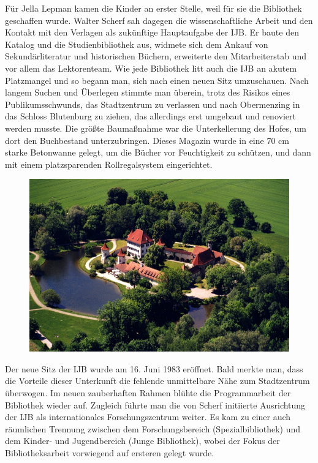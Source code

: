\documentclass[a4paper,
fontsize=11pt,
oneside,
numbers=noperiodatend,
parskip=half-,
bibliography=totoc,
final
]{scrartcl}
\begin{document}
Für Jella Lepman kamen die Kinder an erster Stelle, weil für sie die
Bibliothek geschaffen wurde. Walter Scherf sah dagegen die
wissenschaftliche Arbeit und den Kontakt mit den Verlagen als zukünftige
Hauptaufgabe der IJB. Er baute den Katalog und die Studienbibliothek
aus, widmete sich dem Ankauf von Sekundärliteratur und historischen
Büchern, erweiterte den Mitarbeiterstab und vor allem das Lektorenteam.
Wie jede Bibliothek litt auch die IJB an akutem Platzmangel und so
begann man, sich nach einen neuen Sitz umzuschauen. Nach langem Suchen
und Überlegen stimmte man überein, trotz des Risikos eines
Publikumsschwunds, das Stadtzentrum zu verlassen und nach Obermenzing in
das Schloss Blutenburg zu ziehen, das allerdings erst umgebaut und
renoviert werden musste. Die größte Baumaßnahme war die Unterkellerung
des Hofes, um dort den Buchbestand unterzubringen. Dieses Magazin wurde
in eine 70 cm starke Betonwanne gelegt, um die Bücher vor Feuchtigkeit
zu schützen, und dann mit einem platzsparenden Rollregalsystem
eingerichtet.

\begin{figure}[htbp]
\centering
\includegraphics{img/bild13.jpg}
\end{figure}

Der neue Sitz der IJB wurde am 16. Juni 1983 eröffnet. Bald merkte man,
dass die Vorteile dieser Unterkunft die fehlende unmittelbare Nähe zum
Stadtzentrum überwogen. Im neuen zauberhaften Rahmen blühte die
Programmarbeit der Bibliothek wieder auf. Zugleich führte man die von
Scherf initiierte Ausrichtung der IJB als internationales
Forschungszentrum weiter. Es kam zu einer auch räumlichen Trennung
zwischen dem Forschungsbereich (Spezialbibliothek) und dem Kinder- und
Jugendbereich (Junge Bibliothek), wobei der Fokus der Bibliotheksarbeit
vorwiegend auf ersteren gelegt wurde.
\end{document}
